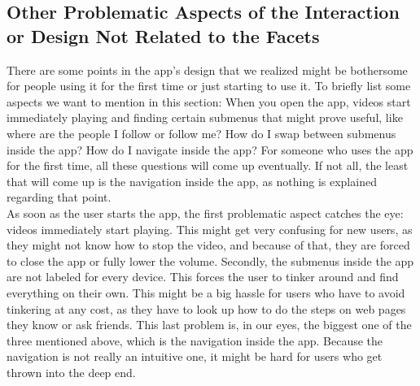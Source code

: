 \documentclass[12pt, letterpaper]{article}
\begin{document}
\subsection{Other Problematic Aspects of the Interaction or Design Not Related to the Facets}
There are some points in the app's design that we realized might be bothersome for people using it for the first time or just starting to use it. To briefly list some aspects we want to mention in this section: When you open the app, videos start immediately playing and finding certain submenus that might prove useful, like where are the people I follow or follow me? How do I swap between submenus inside the app? How do I navigate inside the app? For someone who uses the app for the first time, all these questions will come up eventually. If not all, the least that will come up is the navigation inside the app, as nothing is explained regarding that point. \\
As soon as the user starts the app, the first problematic aspect catches the eye: videos immediately start playing. This might get very confusing for new users, as they might not know how to stop the video, and because of that, they are forced to close the app or fully lower the volume. Secondly, the submenus inside the app are not labeled for every device. This forces the user to tinker around and find everything on their own. This might be a big hassle for users who have to avoid tinkering at any cost, as they have to look up how to do the steps on web pages they know or ask friends. This last problem is, in our eyes, the biggest one of the three mentioned above, which is the navigation inside the app. Because the navigation is not really an intuitive one, it might be hard for users who get thrown into the deep end.
\end{document}
